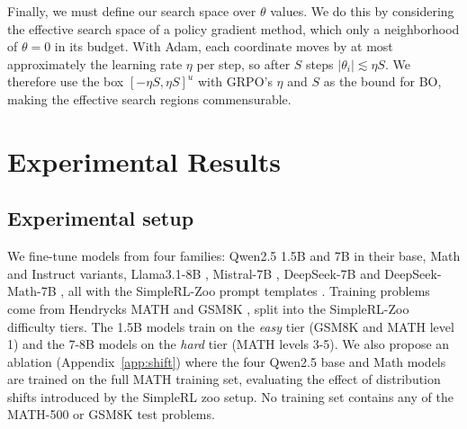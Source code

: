 \documentclass[twoside]{article}
\newcommand{\llmbo}{LlMBO}
\begin{document}
Finally, we must define our search space over $\theta$ values. 
We do this by considering the effective search space of a policy gradient method, which only a neighborhood of $\theta = 0$ in its budget.
With Adam, each coordinate moves by at most approximately the learning rate $\eta$ per step, so after $S$ steps $|\theta_i| \lesssim \eta S$.
We therefore use the box $[-\eta S, \eta S]^u$ with GRPO's $\eta$ and $S$ as the bound for BO, making the effective search regions commensurable.



\section{Experimental Results}
\subsection{Experimental setup}\label{sec:experiments}
\begin{table}[t]
\centering
\caption{Paired gap \llmbo{} $-$ GRPO (points) per model (rows) at $u = 1, 2, 4$ and benchmark (columns), mean over seed pairs; green: \llmbo{} ahead. avg@4: accuracy averaged over four completions at $T{=}1$; greedy: accuracy of the greedy completion (Section~\ref{sec:greedy-objective}); \llmbo{} is trained on the metric of each column. One row block per $u$, each listing the four vanilla base models and the two math-specialized ones, each group closed by its \emph{Avg} row. Standard errors and $u \le 16$ in Table~\ref{tab:main}; the Qwen2.5 1.5B and Instruct models in Appendices~\ref{app:small} and~\ref{app:instruct}.}
\label{tab:headline}\vspace{0.3em}
\footnotesize\renewcommand{\arraystretch}{0.9}\setlength{\tabcolsep}{2.5pt}

\vspace{6pt}
\end{table}

We fine-tune \nModels{} models from four families: Qwen2.5 1.5B and 7B \citep{qwen2025qwen25} in their base, Math \citep{yang2024qwen25math} and Instruct variants, Llama3.1-8B \citep{dubey2024llama3}, Mistral-7B \citep{jiang2023mistral}, DeepSeek-7B \citep{bi2024deepseekllm} and DeepSeek-Math-7B \citep{shao2024deepseekmath}, all with the SimpleRL-Zoo prompt templates \citep{zeng2025simplerl}. Training problems come from Hendrycks MATH \citep{hendrycks2021math} and GSM8K \citep{cobbe2021gsm8k}, split into the SimpleRL-Zoo difficulty tiers. The 1.5B models train on the \emph{easy} tier (GSM8K and MATH level 1) and the 7-8B models on the \emph{hard} tier (MATH levels 3-5). We also propose an ablation (Appendix~\ref{app:shift}) where the four Qwen2.5 base and Math models are trained on the full MATH training set, evaluating the effect of distribution shifts introduced by the SimpleRL zoo setup. No training set contains any of the MATH-500 or GSM8K test problems.
\end{document}
